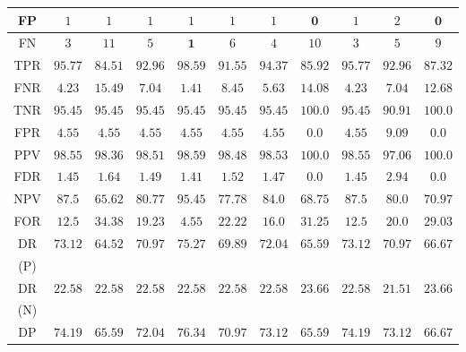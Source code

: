 \let\LaTeXcline\cline\documentclass[sn-mathphys-num]{sn-jnl}\let\cline\LaTeXcline
\begin{document}
\begin{table}[!ht]
\begin{tabular}{|c|c|c|c|c|c|c|c|c|c|c|}
        FP & $1$ & $1$ & $1$ & $1$ & $1$ & $1$ & $\mathbf{0}$ & $1$ & $2$ & $\mathbf{0}$ \\ \hline
        FN & $3$ & $11$ & $5$ & $\mathbf{1}$ & $6$ & $4$ & $10$ & $3$ & $5$ & $9$ \\ \hline
        TPR & $95.77$ & $84.51$ & $92.96$ & $\mathbf{98.59}$ & $91.55$ & $94.37$ & $85.92$ & $95.77$ & $92.96$ & $87.32$ \\ \hline
        FNR & $4.23$ & $15.49$ & $7.04$ & $\mathbf{1.41}$ & $8.45$ & $5.63$ & $14.08$ & $4.23$ & $7.04$ & $12.68$ \\ \hline
        TNR & $95.45$ & $95.45$ & $95.45$ & $95.45$ & $95.45$ & $95.45$ & $\mathbf{100.0}$ & $95.45$ & $90.91$ & $\mathbf{100.0}$ \\ \hline
        FPR & $4.55$ & $4.55$ & $4.55$ & $4.55$ & $4.55$ & $4.55$ & $\mathbf{0.0}$ & $4.55$ & $9.09$ & $\mathbf{0.0}$ \\ \hline
        PPV & $98.55$ & $98.36$ & $98.51$ & $98.59$ & $98.48$ & $98.53$ & $\mathbf{100.0}$ & $98.55$ & $97.06$ & $\mathbf{100.0}$ \\ \hline
        FDR & $1.45$ & $1.64$ & $1.49$ & $1.41$ & $1.52$ & $1.47$ & $\mathbf{0.0}$ & $1.45$ & $2.94$ & $\mathbf{0.0}$ \\ \hline
        NPV & $87.5$ & $65.62$ & $80.77$ & $\mathbf{95.45}$ & $77.78$ & $84.0$ & $68.75$ & $87.5$ & $80.0$ & $70.97$ \\ \hline
        FOR & $12.5$ & $34.38$ & $19.23$ & $\mathbf{4.55}$ & $22.22$ & $16.0$ & $31.25$ & $12.5$ & $20.0$ & $29.03$ \\ \hline
        DR & \multirow{2}{*}{$73.12$} & \multirow{2}{*}{$64.52$} & \multirow{2}{*}{$70.97$} & \multirow{2}{*}{$\mathbf{75.27}$} & \multirow{2}{*}{$69.89$} & \multirow{2}{*}{$72.04$} & \multirow{2}{*}{$65.59$} & \multirow{2}{*}{$73.12$} & \multirow{2}{*}{$70.97$} & \multirow{2}{*}{$66.67$} \\
        (P) & & & & & & & & & & \\ \hline
        DR & \multirow{2}{*}{$22.58$} & \multirow{2}{*}{$22.58$} & \multirow{2}{*}{$22.58$} & \multirow{2}{*}{$22.58$} & \multirow{2}{*}{$22.58$} & \multirow{2}{*}{$22.58$} & \multirow{2}{*}{$\mathbf{23.66}$} & \multirow{2}{*}{$22.58$} & \multirow{2}{*}{$21.51$} & \multirow{2}{*}{$\mathbf{23.66}$} \\     
        (N) & & & & & & & & & & \\ \hline
        DP & \multirow{2}{*}{$74.19$} & \multirow{2}{*}{$65.59$} & \multirow{2}{*}{$72.04$} & \multirow{2}{*}{$\mathbf{76.34}$} & \multirow{2}{*}{$70.97$} & \multirow{2}{*}{$73.12$} & \multirow{2}{*}{$65.59$} & \multirow{2}{*}{$74.19$} & \multirow{2}{*}{$73.12$} & \multirow{2}{*}{$66.67$} \\

\end{tabular}
\end{table}
\end{document}
